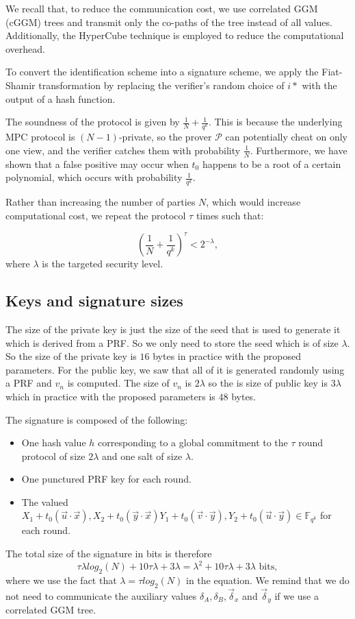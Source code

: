 \documentclass[english]{article}
\begin{document}
		We recall that, to reduce the communication cost, we use correlated GGM (cGGM) trees and transmit only the co-paths of the tree instead of all values. Additionally, the HyperCube technique is employed to reduce the computational overhead.
		
		To convert the identification scheme into a signature scheme, we apply the Fiat-Shamir transformation by replacing the verifier's random choice of $i*$ with the output of a hash function.
		
		The soundness of the protocol is given by $\frac{1}{N} + \frac{1}{q^k}$. This is because the underlying MPC protocol is $(N-1)$-private, so the prover $\mathcal{P}$ can potentially cheat on only one view, and the verifier catches them with probability $\frac{1}{N}$. Furthermore, we have shown that a false positive may occur when $t_0$ happens to be a root of a certain polynomial, which occurs with probability $\frac{1}{q^k}$.
		
		Rather than increasing the number of parties $N$, which would increase computational cost, we repeat the protocol $\tau$ times such that:
		
		$$
		\left( \frac{1}{N} + \frac{1}{q^k} \right)^{\tau} < 2^{-\lambda},
		$$
		where $\lambda$ is the targeted security level.
		
		\subsection{Keys and signature sizes}
		The size of the private key is just the size of the seed that is used to generate it which is derived from a PRF. So we only need to store the seed which is of size $\lambda$. So the size of the private key is $16$ bytes in practice with the proposed parameters. For the public key, we saw that all of it is generated randomly using a PRF and $v_n$ is computed. The size of $v_n$ is $2\lambda$ so the is size of public key is $3\lambda$ which in practice with the proposed parameters is $48$ bytes.
		
		The signature is composed of the following:
		\begin{itemize}
			\item One hash value $h$ corresponding to a global commitment to the $\tau$ round protocol of size $2\lambda$ and one salt of size $\lambda$.
			\item One punctured PRF key for each round.
			\item The valued $X_1+t_0(\vec{u}\cdot\vec{x}), X_2+t_0(\vec{y}\cdot\vec{x}) Y_1+t_0(\vec{v}\cdot\vec{y}), Y_2+t_0(\vec{u}\cdot\vec{y}) \in \mathbb{F}_{q^k}$ for each round.
		\end{itemize}
		The total size of the signature in bits is therefore
		$$
			\tau \lambda log_2(N) + 10\tau \lambda + 3\lambda = \lambda^2 + 10 \tau \lambda + 3 \lambda \text{ bits},
		$$
		where we use the fact that $\lambda = \tau log_2(N)$ in the equation.
		We remind that we do not need to communicate the auxiliary values $\delta_A, \delta_B, \vec{\delta}_x$ and $\vec{\delta}_y$ if we use a correlated GGM tree.
		
\end{document}
